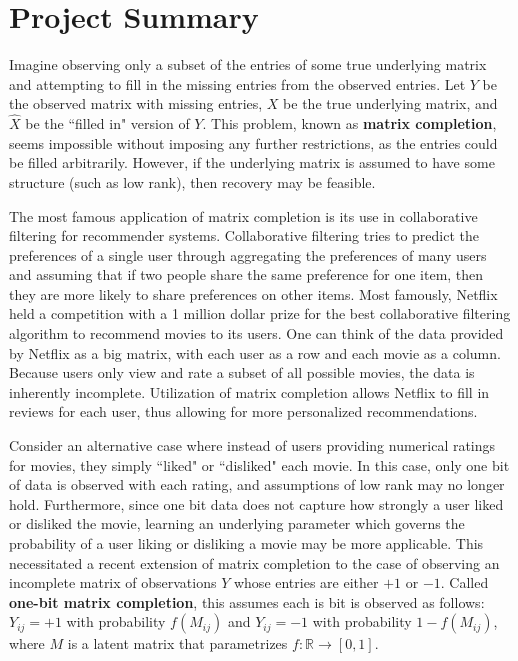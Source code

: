 \section{Project Summary}
Imagine observing only a subset of the entries of some true underlying matrix and attempting to fill in the missing entries from the observed entries. Let $Y$ be the observed matrix with missing entries, $X$ be the true underlying matrix, and $\hat{X}$ be the ``filled in" version of $Y$. This problem, known as \textbf{matrix completion}, seems impossible without imposing any further restrictions, as the entries could be filled arbitrarily. However, if the underlying matrix is assumed to have some structure (such as low rank), then recovery may be feasible.

The most famous application of matrix completion is its use in collaborative filtering for recommender systems. Collaborative filtering tries to predict the preferences of a single user through aggregating the preferences of many users and assuming that if two people share the same preference for one item, then they are more likely to share preferences on other items. Most famously, Netflix held a competition with a 1 million dollar prize for the best collaborative filtering algorithm to recommend movies to its users. One can think of the data provided by Netflix as a big matrix, with each user as a row and each movie as a column. Because users only view and rate a subset of all possible movies, the data is inherently incomplete. Utilization of matrix completion allows Netflix to fill in reviews for each user, thus allowing for more personalized recommendations.

Consider an alternative case where instead of users providing numerical ratings for movies, they simply ``liked" or ``disliked" each movie. In this case, only one bit of data is observed with each rating, and assumptions of low rank may no longer hold. Furthermore, since one bit data does not capture how strongly a user liked or disliked the movie, learning an underlying parameter which governs the probability of a user liking or disliking a movie may be more applicable. This necessitated a recent extension of matrix completion to the case of observing an incomplete matrix of observations $Y$ whose entries are either $+1$ or $-1$. Called \textbf{one-bit matrix completion}, this assumes each is bit is observed as follows: $Y_{ij} = +1$ with probability $f(M_{ij})$ and $Y_{ij} = -1$ with probability $1 - f(M_{ij})$, where $M$ is a latent matrix that parametrizes $f:\mathbb{R} \rightarrow [0,1]$.

